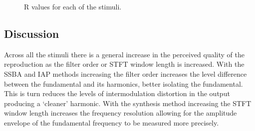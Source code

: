 \begin{figure}[h!]
			\quad
			\caption{R values for each of the stimuli.}
			\label{fig:SMCRNonlin}
		\end{figure}

	\subsection{Discussion}
	\label{sec:PerceptualExperiments-Reconstruction-Discussion}
		Across all the stimuli there is a general increase in the perceived quality of the reproduction as the
		filter order or STFT window length is increased. With the SSBA and IAP methods increasing the filter order
		increases the level difference between the fundamental and its harmonics, better isolating the fundamental.
		This is turn reduces the levels of intermodulation distortion in the output producing a `cleaner' harmonic.
		With the synthesis method increasing the STFT window length increases the frequency resolution allowing for
		the amplitude envelope of the fundamental frequency to be measured more precisely.

